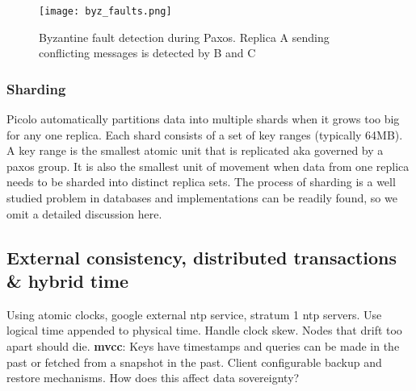 \begin{figure}[h!] \centering
	\texttt{[image: byz\_faults.png]}
	\caption{Byzantine fault detection during Paxos. Replica A sending conflicting messages is detected by B and C}
	\label{fig:byz_faults}
\end{figure}

\subsubsection{Sharding}
Picolo automatically partitions data into multiple shards when it grows too big for any one replica. Each shard consists of a set of key ranges (typically 64MB). A key range is the smallest atomic unit that is replicated aka governed by a paxos group. It is also the smallest unit of movement when data from one replica needs to be sharded into distinct replica sets. The process of sharding is a well studied problem in databases and implementations can be readily found, so we omit a detailed discussion here. 

\subsection{External consistency, distributed transactions \& hybrid time} \label{sec:hybrid_time}
Using atomic clocks, google external ntp service, stratum 1 ntp servers. Use logical time appended to physical time. Handle clock skew. Nodes that drift too apart should die. 
\newline\newline
\textbf{mvcc}: Keys have timestamps and queries can be made in the past or fetched from a snapshot in the past. Client configurable backup and restore mechanisms. How does this affect data sovereignty?

